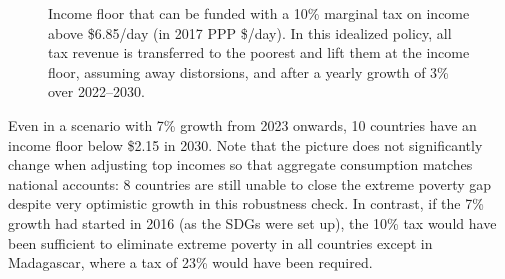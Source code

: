 \begin{figure}[t!]
  \caption[Income floor of 10\% tax above \$6.85/day in 2030 after 3\% growth.]{Income floor that can be funded with a 10\% marginal tax on income above \$6.85/day (in 2017 PPP \$/day). In this idealized policy, all tax revenue is transferred to the poorest and lift them at the income floor, assuming away distorsions, and after a yearly growth of 3\% over 2022--2030. 
  }\label{fig:demogrant_7__10}
\end{figure}

Even in a scenario with 7\% growth from 2023 onwards, 10 countries have an income floor below \$2.15 in 2030. Note that the picture does not significantly change when adjusting top incomes so that aggregate consumption matches national accounts: %
8 countries are still unable to close the extreme poverty gap despite very optimistic growth in this robustness check. In contrast, if the 7\% growth had started in 2016 (as the SDGs were set up), the 10\% tax would have been sufficient to eliminate extreme poverty in all countries except in Madagascar, where a tax of 23\% would have been required.

